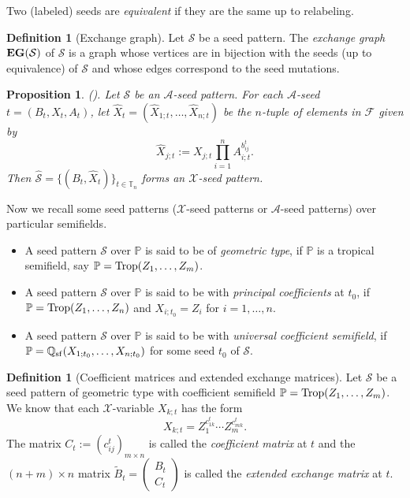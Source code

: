 \documentclass{amsart}
\newtheorem{proposition}[theorem]{Proposition}
\theoremstyle{definition}
\newtheorem{definition}[theorem]{Definition}
\theoremstyle{remark}
\numberwithin{equation}{section}
\begin{document}
Two (labeled) seeds are {\em equivalent} if they are the same up to relabeling.

\begin{definition}[Exchange graph]
Let $\mathcal S$ be a seed pattern. The {\em exchange graph} ${\bf EG}(\mathcal S)$ of $\mathcal S$ is a graph whose vertices are in bijection with the seeds (up to equivalence) of $\mathcal S$ and whose edges correspond to the seed mutations.
\end{definition}

\begin{proposition}{\rm (}\cite[Proposition 3.9]{FZ3}{\rm ).}
\label{proxp} Let $\mathcal S$ be an $\mathscr A$-seed pattern. For each $\mathscr A$-seed $t=(B_t,X_t,A_t)$, let $\widehat X_{t}=(\widehat X_{1;t},\ldots,\widehat X_{n;t})$ be the $n$-tuple of elements in $\mathcal F$ given by
 $$\widehat X_{j; t}:=X_{j;t}\prod\limits_{i=1}^nA_{i;t}^{b_{ij}^{t}}.$$ Then $\widehat {\mathcal S}=\{(B_{t},\widehat X_{t})\}_{t\in\mathbb T_n}$ forms an  $\mathscr X$-seed pattern.
\end{proposition}


Now we recall some seed patterns ($\mathscr X$-seed patterns or $\mathscr A$-seed patterns) over particular semifields.
\begin{itemize}
\item A seed pattern  $\mathcal S$  over  $\mathbb P$ is said to be of {\em geometric type}, if $\mathbb P$ is a tropical semifield, say $\mathbb P={\rm Trop}(Z_1,\ldots,Z_m)$.

\item A seed pattern  $\mathcal S$  over  $\mathbb P$ is said to be with {\em principal coefficients} at $t_0$, if $\mathbb P={\rm Trop}(Z_1,\ldots,Z_n)$ and $X_{i;t_0}=Z_i$ for $i=1,\ldots,n$.

    \item A seed pattern  $\mathcal S$ over  $\mathbb P$ is said to be with {\em universal coefficient semifield}, if $\mathbb P=\mathbb {Q}_{\rm {sf}}(X_{1;t_0},\ldots,X_{n;t_0})$ for some seed $t_0$ of $\mathcal S$.
\end{itemize}



\begin{definition}[Coefficient matrices and extended exchange matrices] \label{def:extended_exchange_mat}
Let $\mathcal S$ be a seed pattern of geometric type with coefficient semifield $\mathbb P={\rm Trop}(Z_1,\ldots,Z_m)$. We know that each  $\mathscr X$-variable $X_{k;t}$ has the form $$X_{k;t}=Z_1^{c_{1k}^t}\cdots Z_m^{c_{mk}^t}.$$
The matrix $C_t:=(c_{ij}^t)_{m\times n}$ is called the {\em coefficient matrix} at $t$ and the $(n+m)\times n$ matrix $\widetilde B_t=\begin{pmatrix}B_t\\C_t\end{pmatrix}$ is called the {\em extended exchange matrix} at $t$.
\end{definition}
\end{document}
